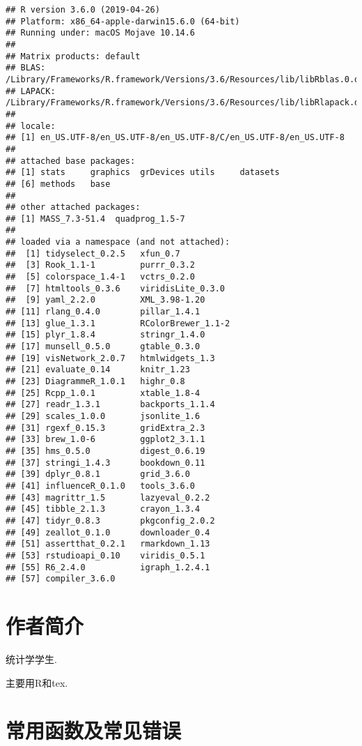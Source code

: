 \documentclass[]{ctexbook}
\begin{document}
\begin{verbatim}
## R version 3.6.0 (2019-04-26)
## Platform: x86_64-apple-darwin15.6.0 (64-bit)
## Running under: macOS Mojave 10.14.6
## 
## Matrix products: default
## BLAS:   /Library/Frameworks/R.framework/Versions/3.6/Resources/lib/libRblas.0.dylib
## LAPACK: /Library/Frameworks/R.framework/Versions/3.6/Resources/lib/libRlapack.dylib
## 
## locale:
## [1] en_US.UTF-8/en_US.UTF-8/en_US.UTF-8/C/en_US.UTF-8/en_US.UTF-8
## 
## attached base packages:
## [1] stats     graphics  grDevices utils     datasets 
## [6] methods   base     
## 
## other attached packages:
## [1] MASS_7.3-51.4  quadprog_1.5-7
## 
## loaded via a namespace (and not attached):
##  [1] tidyselect_0.2.5   xfun_0.7          
##  [3] Rook_1.1-1         purrr_0.3.2       
##  [5] colorspace_1.4-1   vctrs_0.2.0       
##  [7] htmltools_0.3.6    viridisLite_0.3.0 
##  [9] yaml_2.2.0         XML_3.98-1.20     
## [11] rlang_0.4.0        pillar_1.4.1      
## [13] glue_1.3.1         RColorBrewer_1.1-2
## [15] plyr_1.8.4         stringr_1.4.0     
## [17] munsell_0.5.0      gtable_0.3.0      
## [19] visNetwork_2.0.7   htmlwidgets_1.3   
## [21] evaluate_0.14      knitr_1.23        
## [23] DiagrammeR_1.0.1   highr_0.8         
## [25] Rcpp_1.0.1         xtable_1.8-4      
## [27] readr_1.3.1        backports_1.1.4   
## [29] scales_1.0.0       jsonlite_1.6      
## [31] rgexf_0.15.3       gridExtra_2.3     
## [33] brew_1.0-6         ggplot2_3.1.1     
## [35] hms_0.5.0          digest_0.6.19     
## [37] stringi_1.4.3      bookdown_0.11     
## [39] dplyr_0.8.1        grid_3.6.0        
## [41] influenceR_0.1.0   tools_3.6.0       
## [43] magrittr_1.5       lazyeval_0.2.2    
## [45] tibble_2.1.3       crayon_1.3.4      
## [47] tidyr_0.8.3        pkgconfig_2.0.2   
## [49] zeallot_0.1.0      downloader_0.4    
## [51] assertthat_0.2.1   rmarkdown_1.13    
## [53] rstudioapi_0.10    viridis_0.5.1     
## [55] R6_2.4.0           igraph_1.2.4.1    
## [57] compiler_3.6.0
\end{verbatim}

\hypertarget{author}{%
\chapter*{作者简介}\label{author}}


统计学学生.

主要用R和tex.

\mainmatter

\hypertarget{section-2}{%
\chapter{常用函数及常见错误}\label{section-2}}
\end{document}
